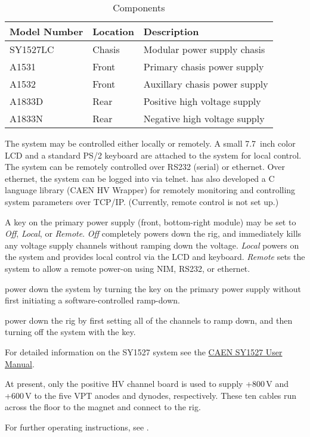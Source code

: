 \begin{table}[htbp]\begin{center}
    \begin{tabular}{>{\ttfamily}l l l}
      \toprule
      \normalfont Model Number & Location & Description \\
      \midrule
      SY1527LC & Chasis & Modular power supply chasis \\
      A1531 & Front & Primary chasis power supply \\
      A1532 & Front & Auxillary chasis power supply \\
      A1833D & Rear & Positive high voltage supply \\
      A1833N & Rear & Negative high voltage supply \\
      \bottomrule
    \end{tabular}
    \caption{ Components}
    \label{tab:eq_high_voltage:parts}
\end{center}\end{table}

The system may be controlled either locally or remotely.  A small 7.7~inch color LCD and a standard PS/2 keyboard are attached to the system for local control.  The system can be remotely controlled over RS232 (serial) or ethernet.  Over ethernet, the system can be logged into via telnet.   has also developed a C language library (CAEN HV Wrapper) for remotely monitoring and controlling system parameters over TCP/IP.  (Currently, remote control is not set up.)

A key on the primary power supply (front, bottom-right module) may be set to \textit{Off}, \textit{Local}, or \textit{Remote}.  \textit{Off} completely powers down the rig, and immediately kills any voltage supply channels without ramping down the voltage.  \textit{Local} powers on the system and provides local control via the LCD and keyboard.  \textit{Remote} sets the system to allow a remote power-on using NIM, RS232, or ethernet.

\begin{pleasedonot} power down the system by turning the key on the primary power supply without first initiating a software-controlled ramp-down.\end{pleasedonot}

\begin{pleasedo} power down the rig by first setting all of the channels to ramp down, and then turning off the system with the key.\end{pleasedo}

\noindent
For detailed information on the SY1527 system see the \href{Manuals/CAEN sy1527usermanual_rev15}{CAEN SY1527 User Manual}.

At present, only the positive HV channel board is used to supply +800\,V and +600\,V to the five VPT anodes and dynodes, respectively.  These ten cables run across the floor to the magnet and connect to the rig.

For further operating instructions, see .

